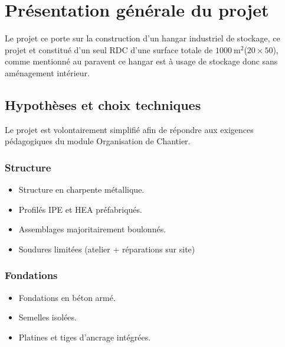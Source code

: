 \documentclass[12pt,a4paper]{report}
\begin{document}
	
	
	
	
	\chapter{Présentation générale du projet}
	
	Le projet ce porte sur la construction d'un hangar industriel de stockage, ce projet et constitué d'un seul RDC d'une surface totale de $1000 ~\unit{\meter^{2}}$($20 \times 50$), comme mentionné au paravent ce hangar est à usage de stockage donc sans aménagement intérieur.
	
	
	\section{Hypothèses et choix techniques}
	
	Le projet est volontairement simplifié afin de répondre aux exigences pédagogiques du module Organisation de Chantier.
	
	
	\subsection{Structure}
	
	\begin{itemize}
		\item Structure en charpente métallique.
		
		\item Profilés IPE et HEA préfabriqués.
		
		\item Assemblages majoritairement boulonnés.
		
		\item Soudures limitées (atelier + réparations sur site)
	\end{itemize}
	
	\subsection{Fondations}
	
	\begin{itemize}
		\item Fondations en béton armé.
		
		\item Semelles isolées.
		
		\item Platines et tiges d’ancrage intégrées.
	\end{itemize}
	
\end{document}

